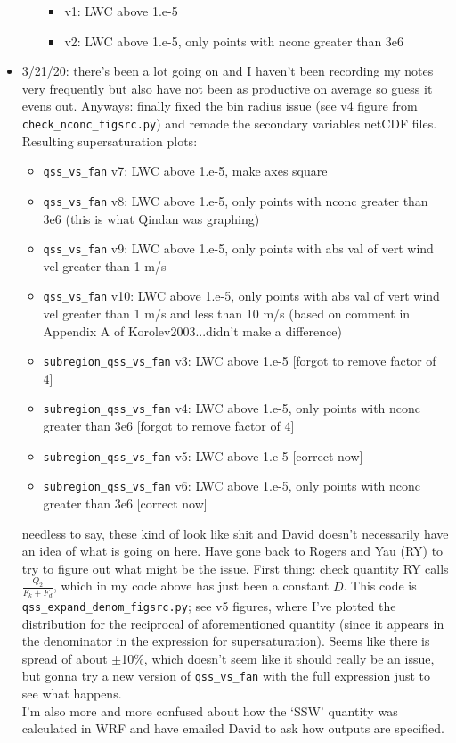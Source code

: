 \documentclass{article}
\begin{document}
\begin{itemize}
\begin{itemize}
		\begin{itemize}
			\item v1: LWC above 1.e-5
			\item v2: LWC above 1.e-5, only points with nconc greater than 3e6
		\end{itemize}
	\end{itemize}
	\item 3/21/20: there's been a lot going on and I haven't been recording my notes very frequently but also have not been as productive on average so guess it evens out. Anyways: finally fixed the bin radius issue (see v4 figure from \texttt{check\_nconc\_figsrc.py}) and remade the secondary variables netCDF files. Resulting supersaturation plots:
	\begin{itemize}
			\item \texttt{qss\_vs\_fan} v7: LWC above 1.e-5, make axes square
			\item \texttt{qss\_vs\_fan} v8: LWC above 1.e-5, only points with nconc greater than 3e6 (this is what Qindan was graphing)
			\item \texttt{qss\_vs\_fan} v9: LWC above 1.e-5, only points with abs val of vert wind vel greater than 1 m/s
			\item \texttt{qss\_vs\_fan} v10: LWC above 1.e-5, only points with abs val of vert wind vel greater than 1 m/s and less than 10 m/s (based on comment in Appendix A of Korolev2003...didn't make a difference)
			\item \texttt{subregion\_qss\_vs\_fan} v3: LWC above 1.e-5 [forgot to remove factor of 4]
			\item \texttt{subregion\_qss\_vs\_fan} v4: LWC above 1.e-5, only points with nconc greater than 3e6 [forgot to remove factor of 4]
			\item \texttt{subregion\_qss\_vs\_fan} v5: LWC above 1.e-5 [correct now]
			\item \texttt{subregion\_qss\_vs\_fan} v6: LWC above 1.e-5, only points with nconc greater than 3e6 [correct now] 
	\end{itemize}
	needless to say, these kind of look like shit and David doesn't necessarily have an idea of what is going on here. Have gone back to Rogers and Yau (RY) to try to figure out what might be the issue. First thing: check quantity RY calls $\frac{Q_2}{F_k + F_d}$, which in my code above has just been a constant $D$. This code is \texttt{qss\_expand\_denom\_figsrc.py}; see v5 figures, where I've plotted the distribution for the reciprocal of aforementioned quantity (since it appears in the denominator in the expression for supersaturation). Seems like there is spread of about $\pm$10\%, which doesn't seem like it should really be an issue, but gonna try a new version of \texttt{qss\_vs\_fan} with the full expression just to see what happens. \\
	I'm also more and more confused about how the `SSW' quantity was calculated in WRF and have emailed David to ask how outputs are specified.
	
\end{itemize}
\end{document}
